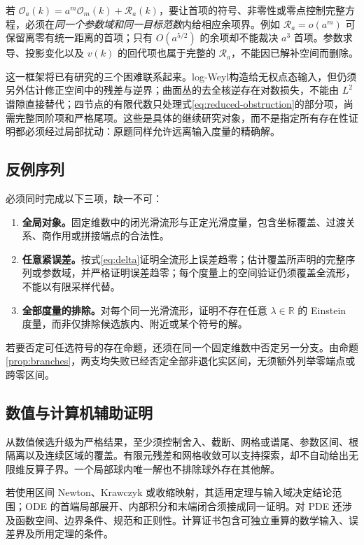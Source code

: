 \documentclass[11pt,a4paper]{article}
\theoremstyle{definition}
\begin{document}
若 $\mathcal O_a(k)=a^m\mathcal O_m(k)+\mathcal R_a(k)$，要让首项的符号、非零性或零点控制完整方程，必须在\emph{同一个参数域和同一目标范数}内给相应余项界。例如 $\mathcal R_a=o(a^m)$ 可保留离零有统一距离的首项；只有 $O(a^{5/2})$ 的余项却不能裁决 $a^3$ 首项。参数求导、投影变化以及 $v(k)$ 的回代项也属于完整的 $\mathcal R_a$，不能因已解补空间而删除。

这一框架将已有研究的三个困难联系起来。log-Weyl构造给无权点态输入，但仍须另外估计修正空间中的残差与逆界；曲面丛的去全核逆存在对数损失，不能由 $L^2$ 谱隙直接替代；四节点的有限代数只处理式\eqref{eq:reduced-obstruction}的部分项，尚需完整同阶项和严格尾项。这些是具体的继续研究对象，而不是指定所有存在性证明都必须经过局部扰动：原题同样允许远离输入度量的精确解。

\subsection{反例序列}

必须同时完成以下三项，缺一不可：
\begin{enumerate}
\item \textbf{全局对象。}固定维数中的闭光滑流形与正定光滑度量，包含坐标覆盖、过渡关系、商作用或拼接端点的合法性。
\item \textbf{任意紧误差。}按式\eqref{eq:delta}证明全流形上误差趋零；估计覆盖所声明的完整序列或参数域，并严格证明误差趋零；每个度量上的空间验证仍须覆盖全流形，不能以有限采样代替。
\item \textbf{全部度量的排除。}对每个同一光滑流形，证明不存在任意 $\lambda\in\mathbb R$ 的 Einstein 度量，而非仅排除候选族内、附近或某个符号的解。
\end{enumerate}
若要否定可任选符号的存在命题，还须在同一个固定维数中否定另一分支。由命题\ref{prop:branches}，两支均失败已经否定全部非退化实区间，无须额外列举零端点或跨零区间。

\subsection{数值与计算机辅助证明}

从数值候选升级为严格结果，至少须控制舍入、截断、网格或谱尾、参数区间、根隔离以及连续区域的覆盖。有限元残差和网格收敛可以支持探索，却不自动给出无限维反算子界。一个局部球内唯一解也不排除球外存在其他解。

若使用区间 Newton、Krawczyk 或收缩映射，其适用定理与输入域决定结论范围；ODE 的首端局部展开、内部积分和末端闭合须接成同一证明。对 PDE 还涉及函数空间、边界条件、规范和正则性。计算证书包含可独立重算的数学输入、误差界及所用定理的条件。
\end{document}
